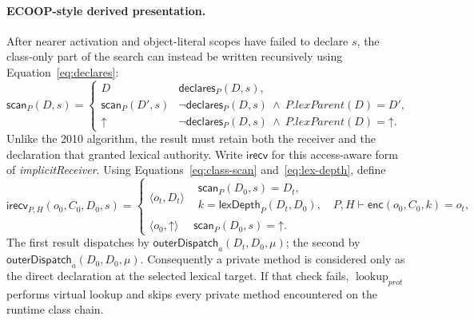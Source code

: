 \documentclass[11pt]{article}
\numberwithin{equation}{section}
\newcommand{\undef}{\mathord{\uparrow}}
\newcommand{\lookup}{\mathop{\mathrm{lookup}}}
\begin{document}
\paragraph{ECOOP-style derived presentation.}
After nearer activation and object-literal scopes have failed to declare $s$,
the class-only part of the search can instead be written recursively using
Equation~\eqref{eq:declares}:
\begin{equation}\label{eq:class-scan}
 \mathsf{scan}_P(D,s)=
 \begin{cases}
  D & \mathsf{declares}_P(D,s),\\
  \mathsf{scan}_P(D',s) & \neg\mathsf{declares}_P(D,s)\ \land\
                           P.\mathit{lexParent}(D)=D',\\
  \undef & \neg\mathsf{declares}_P(D,s)\ \land\
            P.\mathit{lexParent}(D)=\undef.
 \end{cases}
\end{equation}
Unlike the 2010 algorithm, the result must retain both the receiver and the
declaration that granted lexical authority.  Write $\mathsf{irecv}$ for this
access-aware form of \emph{implicitReceiver}.  Using
Equations~\eqref{eq:class-scan} and~\eqref{eq:lex-depth}, define
\begin{equation}\label{eq:implicit-receiver}
 \mathsf{irecv}_{P,H}(o_0,C_0,D_0,s)=
 \begin{cases}
  \langle o_t,D_t\rangle &
    \begin{array}{l}
      \mathsf{scan}_P(D_0,s)=D_t,\\[-1mm]
      k=\mathsf{lexDepth}_P(D_t,D_0),\quad
      P,H\vdash\mathsf{enc}(o_0,C_0,k)=o_t,
    \end{array}\\[3mm]
  \langle o_0,\undef\rangle & \mathsf{scan}_P(D_0,s)=\undef.
 \end{cases}
\end{equation}
The first result dispatches by $\mathsf{outerDispatch}_a(D_t,D_0,\mu)$; the second by
$\mathsf{outerDispatch}_a(D_0,D_0,\mu)$.  Consequently a private method is considered
only as the direct declaration at the selected lexical target.  If that check
fails, $\lookup_{prot}$ performs virtual lookup and skips every private method
encountered on the runtime class chain.
\end{document}
